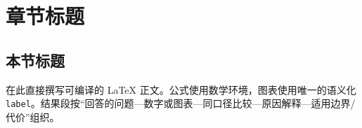 \section{章节标题}

\subsection{本节标题}

在此直接撰写可编译的 LaTeX 正文。公式使用数学环境，图表使用唯一的语义化 \texttt{label}。结果段按“回答的问题—数字或图表—同口径比较—原因解释—适用边界/代价”组织。

